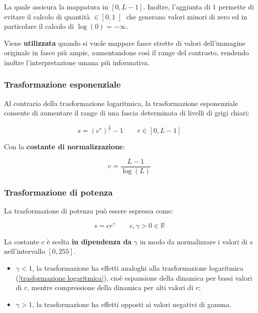 \documentclass[a4paper]{article}
\begin{document}
	\noindent
	La quale assicura la mappatura in $\left[0, L - 1\right]$. Inoltre, l'aggiunta di $1$ permette di evitare il calcolo di quantità $\in\left[0,1\right[$ che generano valori minori di zero ed in particolare il calcolo di $\log\left(0\right) = -\infty$.\newline
	
	\noindent
	Viene \textbf{utilizzata} quando si vuole mappare fasce strette di valori dell'immagine originale in fasce più ampie, aumentandone così il range del contrasto, rendendo inoltre l'interpretazione umana più informativa.
	
	\subsubsection{Trasformazione esponenziale}
	
	Al contrario della trasformazione logaritmica, la trasformazione esponenziale consente di aumentare il range di una fascia determinata di livelli di grigi chiari:
	
	\begin{equation*}
		s = \left(e^{r}\right)^{\frac{1}{c}} - 1 \hspace{2em} r \in \left[0, L - 1\right]
	\end{equation*}

	\noindent
	Con la \textbf{costante di normalizzazione}:
	
	\begin{equation*}
		c = \dfrac{L - 1}{\log\left(L\right)}
	\end{equation*}

	\newpage

	\subsubsection{Trasformazione di potenza}
	
	La trasformazione di potenza può essere espressa come:
	
	\begin{equation*}
		s = cr^{\gamma} \hspace{2em} c,\gamma > 0 \in \mathbb{R}
	\end{equation*}

	\noindent
	La costante $c$ è scelta \textbf{in dipendenza da} $\gamma$ in modo da normalizzare i valori di $s$ nell'intervallo $\left[0,255\right]$.
	
	\begin{itemize}[label=-]
		\item $\gamma < 1$, la trasformazione ha effetti analoghi alla trasformazione logaritmica (\ref{trasformazione logaritmica}), cioè espansione della dinamica per bassi valori di $r$, mentre compressione della dinamica per alti valori di $r$;
		
		\item $\gamma > 1$, la trasformazione ha effetti opposti ai valori negativi di gamma.
	\end{itemize}
\end{document}
